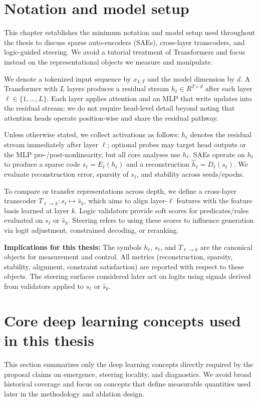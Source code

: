 \documentclass[../ppgc-tese.tex]{subfiles}
\begin{document}
\section{Notation and model setup}
This chapter establishes the minimum notation and model setup used throughout the thesis to discuss sparse auto-encoders (SAEs), cross-layer transcoders, and logic-guided steering. We avoid a tutorial treatment of Transformers and focus instead on the representational objects we measure and manipulate.

We denote a tokenized input sequence by $x_{1:T}$ and the model dimension by $d$. A Transformer with $L$ layers produces a residual stream $h_\ell \in R^{T\times d}$ after each layer $\ell\in\{1,\dots,L\}$. Each layer applies attention and an MLP that write updates into the residual stream; we do not require head-level detail beyond noting that attention heads operate position-wise and share the residual pathway.

Unless otherwise stated, we collect activations as follows: $h_\ell$ denotes the residual stream immediately after layer $\ell$; optional probes may target head outputs or the MLP pre-/post-nonlinearity, but all core analyses use $h_\ell$. SAEs operate on $h_\ell$ to produce a sparse code $s_\ell = E_\ell(h_\ell)$ and a reconstruction $\hat h_\ell = D_\ell(s_\ell)$. We evaluate reconstruction error, sparsity of $s_\ell$, and stability across seeds/epochs.

To compare or transfer representations across depth, we define a cross-layer transcoder $T_{\ell\to k}: s_\ell \mapsto \hat s_k$, which aims to align layer-$\ell$ features with the feature basis learned at layer $k$. Logic validators provide soft scores for predicates/rules evaluated on $s_\ell$ or $\hat s_k$. Steering refers to using these scores to influence generation via logit adjustment, constrained decoding, or reranking.

\textbf{Implications for this thesis:} The symbols $h_\ell$, $s_\ell$, and $T_{\ell\to k}$ are the canonical objects for measurement and control. All metrics (reconstruction, sparsity, stability, alignment, constraint satisfaction) are reported with respect to these objects. The steering surfaces considered later act on logits using signals derived from validators applied to $s_\ell$ or $\hat s_k$.

\section{Core deep learning concepts used in this thesis}
\label{sec:core-dl-concepts}
This section summarizes only the deep learning concepts directly required by the proposal claims on emergence, steering locality, and diagnostics. We avoid broad historical coverage and focus on concepts that define measurable quantities used later in the methodology and ablation design.
\end{document}
